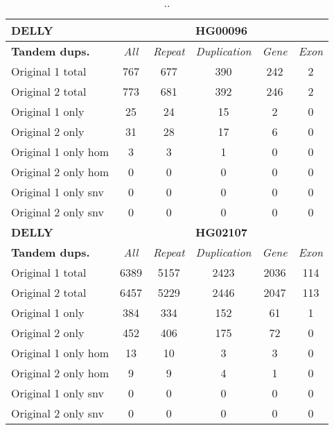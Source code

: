 \begin{table}[htb]
\begin{center}
\begin{tabular}{|l|c||c|c|c|c|}
\hline
{\bf DELLY} & \multicolumn{5}{|c|}{\bf HG00096} \\
\hline
\cline{2-6}
{\bf Tandem dups.} & {\it All} & {\it Repeat} & {\it Duplication} & {\it Gene} & {\it Exon} \\
\hline
Original 1 total & 767 & 677 & 390 & 242 & 2\\ 
\hline
Original 2 total & 773 & 681 & 392 & 246 & 2\\ 
\hline
Original 1 only & 25 & 24 & 15 & 2 & 0\\ 
\hline
Original 2 only & 31 & 28 & 17 & 6 & 0\\ 
\hline
Original 1 only hom & 3 & 3 & 1 & 0 & 0\\ 
\hline
Original 2 only hom & 0 & 0 & 0 & 0 & 0\\ 
\hline
Original 1 only snv & 0 & 0 & 0 & 0 & 0\\ 
\hline
Original 2 only snv & 0 & 0 & 0 & 0 & 0\\ 
\hline
\hline
{\bf DELLY} & \multicolumn{5}{|c|}{\bf HG02107} \\
\hline
\cline{2-6}
{\bf Tandem dups.} & {\it All} & {\it Repeat} & {\it Duplication} & {\it Gene} & {\it Exon} \\
\hline
Original 1 total & 6389 & 5157 & 2423 & 2036 & 114\\ 
\hline
Original 2 total & 6457 & 5229 & 2446 & 2047 & 113\\ 
\hline
Original 1 only & 384 & 334 & 152 & 61 & 1\\ 
\hline
Original 2 only & 452 & 406 & 175 & 72 & 0\\ 
\hline
Original 1 only hom & 13 & 10 & 3 & 3 & 0\\ 
\hline
Original 2 only hom & 9 & 9 & 4 & 1 & 0\\ 
\hline
Original 1 only snv & 0 & 0 & 0 & 0 & 0\\ 
\hline
Original 2 only snv & 0 & 0 & 0 & 0 & 0\\ 
\hline
\end{tabular}
\end{center}
\caption{ .. }
\label{tab:orig-vs-shuf-delly-dups}
\end{table}
